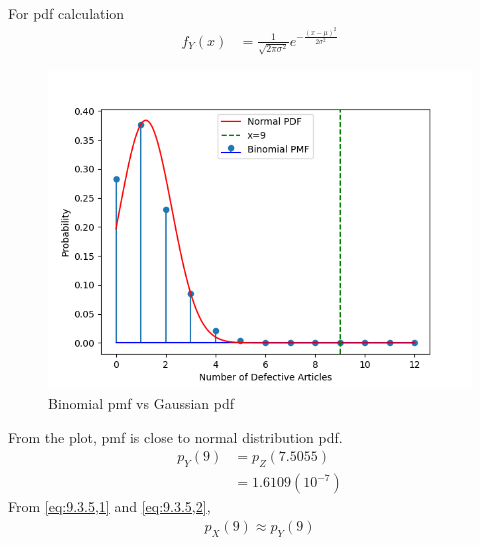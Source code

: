 \documentclass[journal,12pt,twocolumn]{IEEEtran}
\theoremstyle{remark}
\begin{document}
For pdf calculation
\begin{align}
f_Y(x)&=\frac{1}{\sqrt{2\pi\sigma^2}}e^{-\frac{(x-\mu)^2}{2\sigma^2}}
\end{align}
\begin{figure}[!ht]
\centering
\includegraphics[width=\columnwidth]{ncert/9/3/5/figs/figure.png}
\caption{Binomial pmf vs Gaussian pdf }
\label{fig:9.3.5}
\end{figure}
From the plot, pmf is close to normal distribution pdf.
\begin{align}
p_Y(9)&=p_Z(7.5055)\\
&=1.6109(10^{-7})
\label{eq:9.3.5,2}
\end{align}
From \eqref{eq:9.3.5,1} and \eqref{eq:9.3.5,2},
\begin{align}
p_X(9)\approx p_Y(9)
\end{align}
\end{document}
